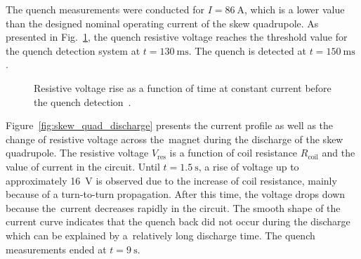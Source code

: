 The quench measurements were conducted for $I=86~\text{A}$, which is a lower value than the designed nominal operating current of the skew quadrupole. As presented in Fig.~\ref{fig:skew_quad_discharge_before_quench_detection}, the quench resistive voltage reaches the threshold value for the quench detection system at $t=130~\text{ms}$. The quench is detected at $t=150~\text{ms}$.~\cite{marco_prioli_mails}

\begin{figure}[H]
\centering
{}
\caption{Resistive voltage rise as a function of time at constant current before the quench detection~\cite{marco_prioli_mails}.}
\label{fig:skew_quad_discharge_before_quench_detection}
\end{figure}

Figure~\ref{fig:skew_quad_discharge} presents the current profile as well as the change of resistive voltage across the~magnet during the discharge of the skew quadrupole. The resistive voltage $V_\text{res}$ is a function of coil resistance $R_\text{coil}$ and the value of current in the circuit. Until $t=1.5~\text{s}$, a rise of voltage up to approximately 16~V is observed due to the increase of coil resistance, mainly because of a turn-to-turn propagation. After this time, the voltage drops down because the~current decreases rapidly in the circuit. The smooth shape of the current curve indicates that the quench back did not occur during the discharge which can be explained by a~relatively long discharge time. The quench measurements ended at $t=9~\text{s}$.

